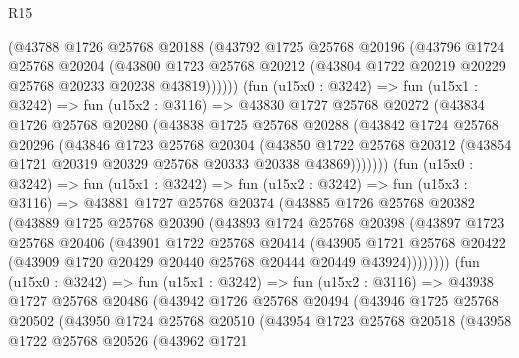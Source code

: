 \begin{lexlean}{R15}
\begin{coremodule}
          (@43788
            @1726
            @25768
            @20188
            (@43792
              @1725
              @25768
              @20196
              (@43796
                @1724
                @25768
                @20204
                (@43800
                  @1723
                  @25768
                  @20212
                  (@43804 @1722 @20219 @20229 @25768 @20233 @20238 @43819))))))
        (fun (u15x0 : @3242) =>
        fun (u15x1 : @3242) =>
        fun (u15x2 : @3116) =>
        @43830
          @1727
          @25768
          @20272
          (@43834
            @1726
            @25768
            @20280
            (@43838
              @1725
              @25768
              @20288
              (@43842
                @1724
                @25768
                @20296
                (@43846
                  @1723
                  @25768
                  @20304
                  (@43850
                    @1722
                    @25768
                    @20312
                    (@43854 @1721 @20319 @20329 @25768 @20333 @20338 @43869)))))))
        (fun (u15x0 : @3242) =>
        fun (u15x1 : @3242) =>
        fun (u15x2 : @3242) =>
        fun (u15x3 : @3116) =>
        @43881
          @1727
          @25768
          @20374
          (@43885
            @1726
            @25768
            @20382
            (@43889
              @1725
              @25768
              @20390
              (@43893
                @1724
                @25768
                @20398
                (@43897
                  @1723
                  @25768
                  @20406
                  (@43901
                    @1722
                    @25768
                    @20414
                    (@43905
                      @1721
                      @25768
                      @20422
                      (@43909 @1720 @20429 @20440 @25768 @20444 @20449 @43924))))))))
        (fun (u15x0 : @3242) =>
        fun (u15x1 : @3242) =>
        fun (u15x2 : @3116) =>
        @43938
          @1727
          @25768
          @20486
          (@43942
            @1726
            @25768
            @20494
            (@43946
              @1725
              @25768
              @20502
              (@43950
                @1724
                @25768
                @20510
                (@43954
                  @1723
                  @25768
                  @20518
                  (@43958
                    @1722
                    @25768
                    @20526
                    (@43962
                      @1721

\end{coremodule}
\end{lexlean}
